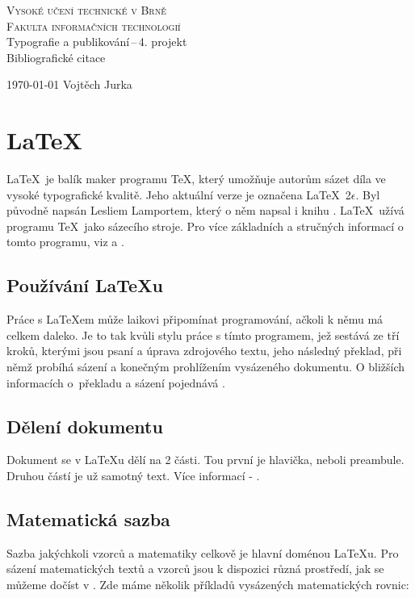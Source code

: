 \documentclass[a4paper, 11pt]{article}
\begin{document}
\begin{titlepage}
		\begin{center}
			\Huge
			\textsc{Vysoké učení technické v Brně} \\
			\huge
			\textsc{Fakulta informačních technologií} \\
			\LARGE
			Typografie a publikování\,--\,4. projekt \\
			\Huge
			Bibliograf{}ické citace
		\end{center}

		{\Large
			\today
			\hfill
			Vojtěch Jurka
		}
	\end{titlepage}
	
	

\section{\LaTeX}
\LaTeX\ je balík maker programu \TeX, který umožňuje autorům sázet díla ve vysoké typografické kvalitě. Jeho aktuální verze je označena \LaTeX\ 2$\epsilon$. Byl původně napsán Lesliem Lamportem, který o něm napsal i knihu \cite{lamport}. \LaTeX\ užívá programu \TeX\ jako sázecího stroje. Pro více základních a stručných informací o tomto programu, viz \cite{wiki} a \cite{martinek}.

\subsection{Používání \LaTeX u}
Práce s \LaTeX em může laikovi připomínat programování, ačkoli k němu má celkem daleko. Je to tak kvůli stylu práce s tímto programem, jež sestává ze tří kroků, kterými jsou psaní a úprava zdrojového textu, jeho následný překlad, při němž probíhá sázení a konečným prohlížením vysázeného dokumentu. O bližších informacích o~překladu a sázení pojednává \cite{rybicka}.

\subsection{Dělení dokumentu}
Dokument se v \LaTeX u dělí na 2 části. Tou první je hlavička, neboli preambule. Druhou částí je už samotný text. Více informací - \cite{root}.

\subsection{Matematická sazba}
Sazba jakýchkoli vzorců a matematiky celkově je hlavní doménou \LaTeX u. Pro sázení matematických textů a vzorců jsou k dispozici různá prostředí, jak se můžeme dočíst v \cite{math}. Zde máme několik příkladů vysázených matematických rovnic:
\end{document}

